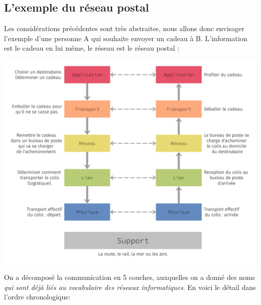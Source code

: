 \subsection{L'exemple du réseau postal}
Les considérations précédentes sont très abstraites, nous allons donc envisager l'exemple d'une personne A qui souhaite envoyer un cadeau à B. L'information est le cadeau en lui même, le réseau est le réseau postal :
\begin{center}
    \includegraphics[width=\textwidth]{ch-reseaux/img/modele_5_couches_poste.png}
\end{center}
On a décomposé la communication en 5 couches, auxquelles on a donné des noms \textit{qui sont déjà liés au vocabulaire des réseaux informatiques}. En voici le détail dans l'ordre chronologique:
